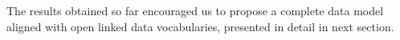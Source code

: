 
The results obtained so far encouraged us to propose a complete data
model aligned with open linked data vocabularies, presented in detail in next section.





